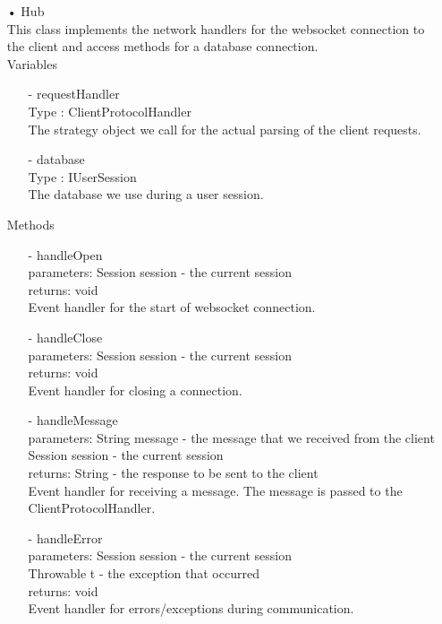 \documentclass[oneside, english, final]{design}
\begin{document}
\begin{itemize}
	\item[•]Hub
	      \\
	      This class implements the network handlers for the websocket connection to the client and access methods for a database connection.
	      \\Variables
	      \begin{itemize}
		      \item[-]requestHandler
		            \\Type : ClientProtocolHandler
		            \\ The strategy object we call for the actual parsing of the client requests.
	      \end{itemize}
	      \begin{itemize}
		      \item[-]database
		            \\Type : IUserSession
		            \\ The database we use during a user session.
	      \end{itemize}
	      Methods
	      \begin{itemize}
		      \item[-]handleOpen
		            \\parameters: Session session - the current session
		            \\returns: void
		            \\Event handler for the start of websocket connection.
		      \item[-]handleClose
		            \\parameters: Session session - the current session
		            \\returns: void
		            \\Event handler for closing a connection.

		      \item[-]handleMessage
		            \\parameters: String message - the message that we received from the client
		            \\Session session - the current session
		            \\returns: String - the response to be sent to the client
		            \\Event handler for receiving a message. The message is passed to the ClientProtocolHandler.

		      \item[-]handleError
		            \\parameters: Session session - the current session
		            \\Throwable t - the exception that occurred
		            \\returns: void
		            \\Event handler for errors/exceptions during communication.
	      \end{itemize}



\end{itemize}
\end{document}
